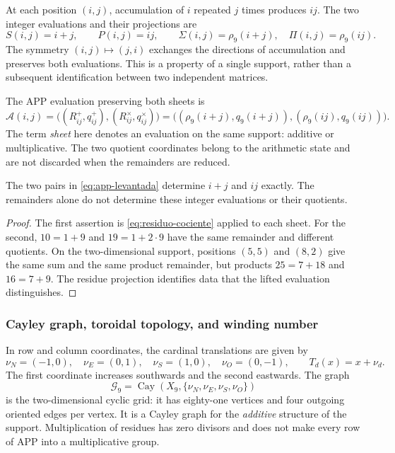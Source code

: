 At each position \((i,j)\), accumulation of \(i\) repeated \(j\) times produces \(ij\). The two integer evaluations and their projections are
\[
 S(i,j)=i+j,\qquad P(i,j)=ij,\qquad
 \Sigma(i,j)=\rho_9(i+j),\quad \Pi(i,j)=\rho_9(ij).
\]
The symmetry \((i,j)\mapsto(j,i)\) exchanges the directions of accumulation and preserves both evaluations. This is a property of a single support, rather than a subsequent identification between two independent matrices.

\begin{definition}
The APP evaluation preserving both sheets is
\begin{equation}
 \mathcal A(i,j)=
 \bigl((R^+_{ij},q^+_{ij}),(R^\times_{ij},q^\times_{ij})\bigr)
 =\bigl((\rho_9(i+j),q_9(i+j)),(\rho_9(ij),q_9(ij))\bigr).
 \label{eq:app-levantada}
\end{equation}
The term \emph{sheet} here denotes an evaluation on the same support: additive or multiplicative. The two quotient coordinates belong to the arithmetic state and are not discarded when the remainders are reduced.
\end{definition}



\begin{proposition}
The two pairs in \eqref{eq:app-levantada} determine \(i+j\) and \(ij\) exactly. The remainders alone do not determine these integer evaluations or their quotients.
\end{proposition}
\begin{proof}
The first assertion is \eqref{eq:residuo-cociente} applied to each sheet. For the second, \(10=1+9\) and \(19=1+2\cdot9\) have the same remainder and different quotients. On the two-dimensional support, positions \((5,5)\) and \((8,2)\) give the same sum and the same product remainder, but products \(25=7+18\) and \(16=7+9\). The residue projection identifies data that the lifted evaluation distinguishes.
\end{proof}

\subsubsection{Cayley graph, toroidal topology, and winding number}

In row and column coordinates, the cardinal translations are given by
\[
 \nu_N=(-1,0),\quad\nu_E=(0,1),\quad
 \nu_S=(1,0),\quad\nu_O=(0,-1),\qquad T_d(x)=x+\nu_d.
\]
The first coordinate increases southwards and the second eastwards. The graph
\[
 \mathscr G_9=\operatorname{Cay}(X_9,\{\nu_N,\nu_E,\nu_S,\nu_O\})
\]
is the two-dimensional cyclic grid: it has eighty-one vertices and four outgoing oriented edges per vertex. It is a Cayley graph for the \emph{additive} structure of the support. Multiplication of residues has zero divisors and does not make every row of APP into a multiplicative group.

